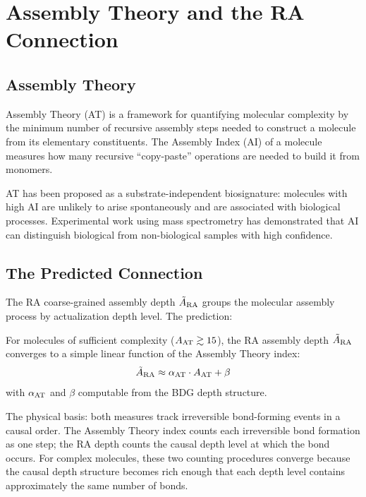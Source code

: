 \documentclass[12pt,a4paper]{article}
\begin{document}
\section{Assembly Theory and the RA Connection}\label{sec:assembly_full}

\subsection{Assembly Theory}

Assembly Theory (AT) \cite{Cronin2016,Walker2023,Marshall2021} is a framework for quantifying molecular complexity by the minimum number of recursive assembly steps needed to construct a molecule from its elementary constituents.  The Assembly Index (AI) of a molecule measures how many recursive ``copy-paste'' operations are needed to build it from monomers.

AT has been proposed as a substrate-independent biosignature: molecules with high AI are unlikely to arise spontaneously and are associated with biological processes.  Experimental work using mass spectrometry has demonstrated that AI can distinguish biological from non-biological samples with high confidence.

\subsection{The Predicted Connection}

The RA coarse-grained assembly depth $\tilde{A}_{\rm RA}$ groups the molecular assembly process by actualization depth level.  The prediction:

\begin{proposition}
For molecules of sufficient complexity ($A_{\rm AT}\gtrsim15$), the RA assembly depth $\tilde{A}_{\rm RA}$ converges to a simple linear function of the Assembly Theory index:
\begin{equation}
  \tilde{A}_{\rm RA} \approx \alpha_{\rm AT}\cdot A_{\rm AT} + \beta
\end{equation}
with $\alpha_{\rm AT}$ and $\beta$ computable from the BDG depth structure.
\end{proposition}

The physical basis: both measures track irreversible bond-forming events in a causal order.  The Assembly Theory index counts each irreversible bond formation as one step; the RA depth counts the causal depth level at which the bond occurs.  For complex molecules, these two counting procedures converge because the causal depth structure becomes rich enough that each depth level contains approximately the same number of bonds.
\end{document}
